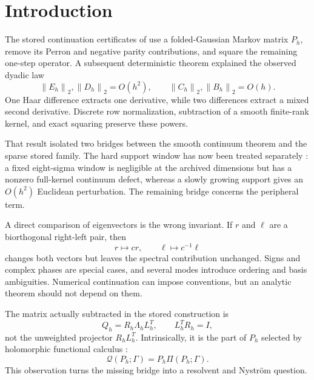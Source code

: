 \documentclass[11pt]{article}
\theoremstyle{definition}
\theoremstyle{remark}
\newcommand{\norm}[1]{\left\lVert #1\right\rVert}
\newcommand{\cQ}{\mathcal Q}
\begin{document}
\section{Introduction}

The stored continuation certificates of
\citet{WangNested2026,WangIterated2026} use a folded-Gaussian Markov matrix
$P_h$, remove its Perron and negative parity contributions, and square the
remaining one-step operator.  A subsequent deterministic theorem
\citep{WangHaar2026} explained the observed dyadic law
\begin{equation}
 \norm{E_h}_2,\norm{D_h}_2=O(h^2),\qquad
 \norm{C_h}_2,\norm{B_h}_2=O(h).
 \label{eq:quarter-half-intro}
\end{equation}
One Haar difference extracts one derivative, while two differences extract a
mixed second derivative.  Discrete row normalization, subtraction of a
smooth finite-rank kernel, and exact squaring preserve these powers.

That result isolated two bridges between the smooth continuum theorem and
the sparse stored family.  The hard support window has now been treated
separately \citep{WangCutoff2026}: a fixed eight-sigma window is negligible
at the archived dimensions but has a nonzero full-kernel continuum defect,
whereas a slowly growing support gives an $O(h^2)$ Euclidean perturbation.
The remaining bridge concerns the peripheral term.

A direct comparison of eigenvectors is the wrong invariant.  If $r$ and
$\ell$ are a biorthogonal right-left pair, then
\[
 r\longmapsto c r,\qquad \ell\longmapsto c^{-1}\ell
\]
changes both vectors but leaves the spectral contribution unchanged.  Signs
and complex phases are special cases, and several modes introduce ordering
and basis ambiguities.  Numerical continuation can impose conventions, but
an analytic theorem should not depend on them.

The matrix actually subtracted in the stored construction is
\begin{equation}
 Q_h=R_h\Lambda_hL_h^T,
 \qquad L_h^TR_h=I,
 \label{eq:stored-weighted-term}
\end{equation}
not the unweighted projector $R_hL_h^T$.  Intrinsically, it is the part of
$P_h$ selected by holomorphic functional calculus \citep{Kato1995}:
\begin{equation}
 \cQ(P_h;\Gamma)=P_h\Pi(P_h;\Gamma).
 \label{eq:intro-riesz}
\end{equation}
This observation turns the missing bridge into a resolvent and Nystr\"om
question.
\end{document}
